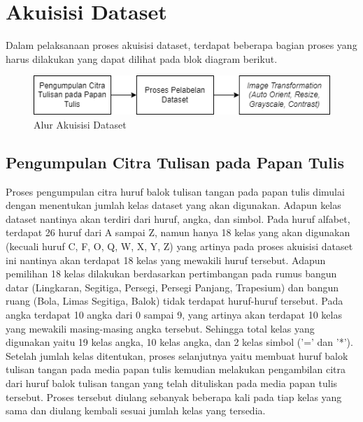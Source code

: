 
\section{Akuisisi Dataset}
\label{sec:akuisisidataset}

Dalam pelaksanaan proses akuisisi dataset, terdapat beberapa bagian proses yang harus dilakukan yang dapat dilihat pada blok diagram berikut.

\begin{figure}[H]
    \centering
    \includegraphics[scale=0.9]{gambar/metodologi_akuisisi_data.png}
    \caption{Alur Akuisisi Dataset}
    \label{fig:alurakuisisidataset}
\end{figure}

\subsection{Pengumpulan Citra Tulisan pada Papan Tulis}
\label{subsec:pengumpulancitra}

Proses pengumpulan citra huruf balok tulisan tangan pada papan tulis dimulai dengan menentukan jumlah kelas dataset yang akan digunakan. Adapun kelas dataset nantinya akan terdiri dari huruf, angka, dan simbol. Pada huruf alfabet, terdapat 26 huruf dari A sampai Z, namun hanya 18 kelas yang akan digunakan (kecuali huruf C, F, O, Q, W, X, Y, Z) yang artinya pada proses akuisisi dataset ini nantinya akan terdapat 18 kelas yang mewakili huruf tersebut. Adapun pemilihan 18 kelas dilakukan berdasarkan pertimbangan pada rumus bangun datar (Lingkaran, Segitiga, Persegi, Persegi Panjang, Trapesium) dan bangun ruang (Bola, Limas Segitiga, Balok) tidak terdapat huruf-huruf tersebut. Pada angka terdapat 10 angka dari 0 sampai 9, yang artinya akan terdapat 10 kelas yang mewakili masing-masing angka tersebut. Sehingga total kelas yang digunakan yaitu 19 kelas angka, 10 kelas angka, dan 2 kelas simbol ('=' dan '*'). Setelah jumlah kelas ditentukan, proses selanjutnya yaitu membuat huruf balok tulisan tangan pada media papan tulis kemudian melakukan pengambilan citra dari huruf balok tulisan tangan yang telah dituliskan pada media papan tulis tersebut. Proses tersebut diulang sebanyak beberapa kali pada tiap kelas yang sama dan diulang kembali sesuai jumlah kelas yang tersedia. \par

